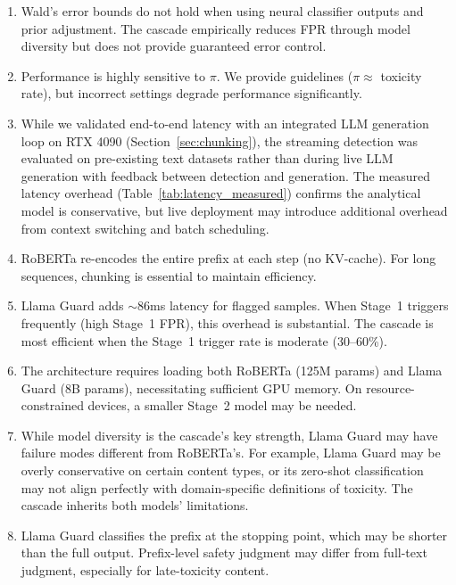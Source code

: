 \documentclass[acmtjournal, acmnowidth]{acmart}
\theoremstyle{definition}
\begin{document}
\begin{enumerate}
    \item Wald's error bounds do not hold when using neural classifier outputs and prior adjustment. The cascade empirically reduces FPR through model diversity but does not provide guaranteed error control.

    \item Performance is highly sensitive to $\pi$. We provide guidelines ($\pi \approx$ toxicity rate), but incorrect settings degrade performance significantly.

    \item While we validated end-to-end latency with an integrated LLM generation loop on RTX 4090 (Section~\ref{sec:chunking}), the streaming detection was evaluated on pre-existing text datasets rather than during live LLM generation with feedback between detection and generation. The measured latency overhead (Table~\ref{tab:latency_measured}) confirms the analytical model is conservative, but live deployment may introduce additional overhead from context switching and batch scheduling.

    \item RoBERTa re-encodes the entire prefix at each step (no KV-cache). For long sequences, chunking is essential to maintain efficiency.

    \item Llama Guard adds ${\sim}$86ms latency for flagged samples. When Stage~1 triggers frequently (high Stage~1 FPR), this overhead is substantial. The cascade is most efficient when the Stage~1 trigger rate is moderate (30--60\%).

    \item The architecture requires loading both RoBERTa (125M params) and Llama Guard (8B params), necessitating sufficient GPU memory. On resource-constrained devices, a smaller Stage~2 model may be needed.

    \item While model diversity is the cascade's key strength, Llama Guard may have failure modes different from RoBERTa's. For example, Llama Guard may be overly conservative on certain content types, or its zero-shot classification may not align perfectly with domain-specific definitions of toxicity. The cascade inherits both models' limitations.

    \item Llama Guard classifies the prefix at the stopping point, which may be shorter than the full output. Prefix-level safety judgment may differ from full-text judgment, especially for late-toxicity content.
\end{enumerate}
\end{document}
